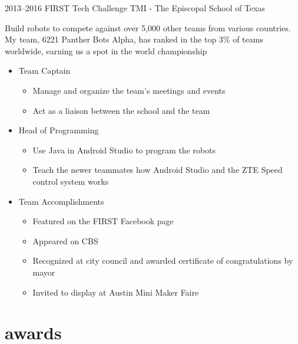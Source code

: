\documentclass[]{friggeri-cv} %
\begin{document}
\begin{entrylist}
	\entry
	{2013--2016}
	{FIRST Tech Challenge}
	{TMI - The Episcopal School of Texas}
	{Build robots to compete against over 5,000 other teams from various countries. My team, 6221 Panther Bots Alpha, has ranked in the top 3\% of teams worldwide, earning us a spot in the world championship
		\begin{itemize}
			\item Team Captain
				\begin{itemize}
					\item Manage and organize the team's meetings and events
					\item Act as a liaison between the school and the team
				\end{itemize}
			\item Head of Programming
				\begin{itemize}
					\item Use Java in Android Studio to program the robots
					\item Teach the newer teammates how Android Studio and the ZTE Speed control system works
				\end{itemize}
		\end{itemize}
		\begin{itemize}
			\item Team Accomplishments
				\begin{itemize}
					\item Featured on the FIRST Facebook page
					\item Appeared on CBS
					\item Recognized at city council and awarded certificate of congratulations by mayor
					\item Invited to display at Austin Mini Maker Faire
				\end{itemize}
		\end{itemize}
	}

\end{entrylist}

\pagebreak

\section{awards}
\end{document}
